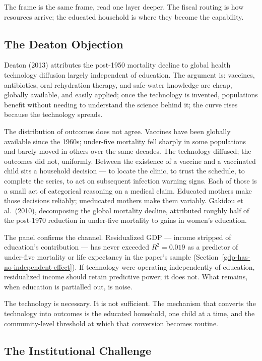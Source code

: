 \documentclass[12pt,letterpaper]{article}
\begin{document}
{The frame is the same frame, read one layer deeper. The fiscal routing is how resources arrive; the educated household is where they become the capability.

\subsection{The Deaton Objection}\label{the-deaton-objection}

Deaton (2013) attributes the post-1950 mortality decline to global health technology diffusion largely independent of education. The argument is: vaccines, antibiotics, oral rehydration therapy, and safe-water knowledge are cheap, globally available, and easily applied; once the technology is invented, populations benefit without needing to understand the science behind it; the curve rises because the technology spreads.

The distribution of outcomes does not agree. Vaccines have been globally available since the 1960s; under-five mortality fell sharply in some populations and barely moved in others over the same decades. The technology diffused; the outcomes did not, uniformly. Between the existence of a vaccine and a vaccinated child sits a household decision --- to locate the clinic, to trust the schedule, to complete the series, to act on subsequent infection warning signs. Each of those is a small act of categorical reasoning on a medical claim. Educated mothers make those decisions reliably; uneducated mothers make them variably. Gakidou et al.\ (2010), decomposing the global mortality decline, attributed roughly half of the post-1970 reduction in under-five mortality to gains in women's education.

The panel confirms the channel. Residualized GDP --- income stripped of education's contribution --- has never exceeded $R^2 = 0.019$ as a predictor of under-five mortality or life expectancy in the paper's sample (Section~\ref{gdp-has-no-independent-effect}). If technology were operating independently of education, residualized income should retain predictive power; it does not. What remains, when education is partialled out, is noise.

The technology is necessary. It is not sufficient. The mechanism that converts the technology into outcomes is the educated household, one child at a time, and the community-level threshold at which that conversion becomes routine.

\subsection{The Institutional Challenge}\label{the-institutional-challenge}

}
\end{document}
